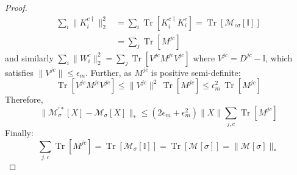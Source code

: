 \begin{proof}
    \begin{align}
        \sum_i \|K^{c\dagger}_i\|^2_2&=\sum_i\operatorname{Tr}[K^{c\dagger}_iK^{c}_i]=\operatorname{Tr}[\mathcal{M}_{c\sigma}[\mathbb{I}]]\\
        &=\sum_j \operatorname{Tr}[M^{jc}]
    \end{align} and similarly $\sum_i \|W^c_i\|^2_2=\sum_j \operatorname{Tr}[V^{jc}M^{jc}V^{jc}]$ where $V^{jc} = D^{jc}-\mathbb{I}$, which satisfies $\|V^{jc}\|\leq\epsilon_m$. Further, as $M^{jc}$ is positive semi-definite:
    \begin{equation}
       \operatorname{Tr}[V^{jc}M^{jc}V^{jc}] \leq \|V^{jc}\|^2\, \operatorname{Tr}[M^{jc}] \leq \epsilon_m^2\, \operatorname{Tr}[M^{jc}]
    \end{equation}
    Therefore,
    \begin{equation}
        \|\mathcal{M}^{\prime *}_{\sigma}[X]-\mathcal{M}_\sigma[X]\|_* 
        \leq (2\epsilon_m+\epsilon_m^2)\|X\|\sum_{j,c}\operatorname{Tr}[M^{jc}] 
    \end{equation}
    Finally:
    \begin{equation}
        \sum_{j,c}\operatorname{Tr}[M^{jc}] = \operatorname{Tr}[\mathcal{M}_{\sigma}[\mathbb{I}]] = \operatorname{Tr}[\mathcal{M}[\sigma]] = \|\mathcal{M}[\sigma]\|_*
    \end{equation}
\end{proof}

